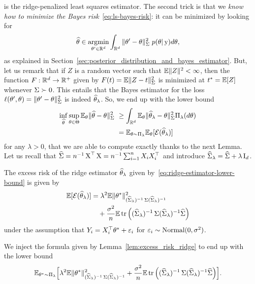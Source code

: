 is the ridge-penalized least squares estimator.
The second trick is that we \emph{know how to minimize the Bayes risk}~\eqref{eq:ls-bayes-risk}: it can be minimized by looking for
\begin{equation*}
	\widehat \theta \in \operatorname*{argmin}_{\theta' \in \mathbb R^d} \int_{\mathbb R^d} \| \theta' - \theta \|_{\operatorname{\boldsymbol \Sigma}}^2 \; p(\theta | \operatorname{{\boldsymbol y}}) d \theta,
\end{equation*}
as explained in Section~\ref{sec:posterior_distribution_and_bayes_estimator}.
But, let us remark that if $Z$ is a random vector such that $\mathbb E \| Z \|^2 < \infty$, then the function $F : \mathbb R^d \rightarrow \mathbb R^+$ given 
by $F(t) = \mathbb E \| Z - t \|_{\operatorname{\boldsymbol \Sigma}}^2$ is minimized at $t^* = \mathbb E[Z]$ whenever 
$\operatorname{\boldsymbol \Sigma} \succ 0$.
This entails that the Bayes estimator for the loss $\ell(\theta', \theta) = \| \theta' - \theta \|_{\operatorname{\boldsymbol \Sigma}}^2$ is indeed $\widehat \theta_\lambda$.
So, we end up with the lower bound 
\begin{align*}
	\inf_{\wh \theta} \sup_{\theta \in \Theta} \E_\theta 
	\norm{\wh \theta - \theta}_{\bSigma}^2 &\geq 
	\int_{\R^d} \E_\theta \norm{\wh \theta_\lambda - \theta}_{\bSigma}^2 \Pi_\lambda(d \theta) \\
	&= \E_{\theta \sim \Pi_\lambda} \E_\theta [\cE(\wh \theta_\lambda)]
\end{align*}
for any $\lambda > 0$, that we are able to compute exactly thanks to the next Lemma.
Let us recall that $\widehat {\operatorname{\boldsymbol \Sigma}} = n^{-1} \operatorname{{\boldsymbol X}}^\top \operatorname{{\boldsymbol X}} = n^{-1} \sum_{i=1}^n X_i X_i^\top$ and introduce $\widehat {\operatorname{\boldsymbol \Sigma}}_\lambda = \widehat {\operatorname{\boldsymbol \Sigma}} + \lambda \operatorname{{\boldsymbol I}}_d$.
\begin{lemma}
	\label{lem:excess_risk_ridge}
	The excess risk of the ridge estimator $\widehat \theta_\lambda$ given by~\eqref{eq:ridge-estimator-lower-bound} is given by
	\begin{align*}
		\mathbb E [\operatorname{{\mathcal E}}(\widehat \theta_\lambda)] &= \lambda^2 \mathbb E \| \theta^* \|_{(\widehat {\operatorname{\boldsymbol \Sigma}}_\lambda)^{-1} \operatorname{\boldsymbol \Sigma} (\widehat {\operatorname{\boldsymbol \Sigma}}_\lambda)^{-1}}^2 \\
		& \quad + \frac{\sigma^2}{n} \mathbb E \operatorname{tr} \Big( (\widehat {\operatorname{\boldsymbol \Sigma}}_\lambda)^{-1} \operatorname{\boldsymbol \Sigma} (\widehat {\operatorname{\boldsymbol \Sigma}}_\lambda)^{-1} \widehat {\operatorname{\boldsymbol \Sigma}} \Big)
	\end{align*}
	under the assumption that $Y_i = X_i^\top \theta^* + \varepsilon_i$ for $\varepsilon_i \sim \operatorname{Normal}(0, \sigma^2)$.
\end{lemma}
We inject the formula given by Lemma~\ref{lem:excess_risk_ridge} to end up with the lower bound
\begin{equation*}
	\mathbb E_{\theta^* \sim \Pi_\lambda} \Big[ \lambda^2 \mathbb E \| \theta^* \|_{(\widehat {\operatorname{\boldsymbol \Sigma}}_\lambda)^{-1} \operatorname{\boldsymbol \Sigma} (\widehat {\operatorname{\boldsymbol \Sigma}}_\lambda)^{-1}}^2  + \frac{\sigma^2}{n} \mathbb E \operatorname{tr} \Big( (\widehat {\operatorname{\boldsymbol \Sigma}}_\lambda)^{-1} \operatorname{\boldsymbol \Sigma} (\widehat {\operatorname{\boldsymbol \Sigma}}_\lambda)^{-1} \widehat {\operatorname{\boldsymbol \Sigma}} \Big) \Big].
\end{equation*}
